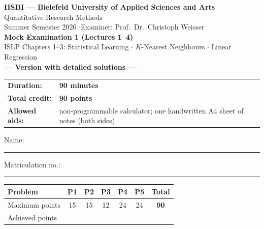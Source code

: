 \documentclass[11pt,a4paper]{article}
\begin{document}
\begin{center}
  {\Large\textbf{HSBI --- Bielefeld University of Applied Sciences and Arts}}\\[1.2mm]
  {\large Quantitative Research Methods}\\[1mm]
  {\normalsize Summer Semester 2026 \quad$\cdot$\quad Examiner: Prof.\ Dr.\ Christoph Weisser}\\[4.5mm]
  {\LARGE\textbf{Mock Examination 1 (Lectures 1--4)}}\\[1.2mm]
  {\normalsize ISLP Chapters 1--3: Statistical Learning $\cdot$ $K$-Nearest Neighbours $\cdot$ Linear Regression}%
  \ifdefined\withsolutions\\[2.2mm]{\large\textcolor{teal!55!black}{\textbf{--- Version with detailed solutions ---}}}\fi
\end{center}

\vspace{2.5mm}
\begin{center}
\begin{tabular}{@{}ll@{}}
  \textbf{Duration:} & \textbf{90 minutes}\\
  \textbf{Total credit:} & \textbf{90 points}\\
  \textbf{Allowed aids:} & non-programmable calculator; one handwritten A4 sheet of notes (both sides)\\
\end{tabular}
\end{center}

\vspace{3mm}
Name: \rule[-1mm]{0.38\textwidth}{0.4pt}\hfill Matriculation no.: \rule[-1mm]{0.24\textwidth}{0.4pt}

\vspace{4.5mm}
\begin{center}
\renewcommand{\arraystretch}{1.35}
\begin{tabular}{|l|c|c|c|c|c|c|}
\hline
\textbf{Problem} & \textbf{P1} & \textbf{P2} & \textbf{P3} & \textbf{P4} & \textbf{P5} & \textbf{Total}\\\hline
Maximum points & 15 & 15 & 12 & 24 & 24 & \textbf{90}\\\hline
Achieved points & \hspace{9mm} & \hspace{9mm} & \hspace{9mm} & \hspace{9mm} & \hspace{9mm} & \hspace{11mm}\\\hline
\end{tabular}
\end{center}
\end{document}
